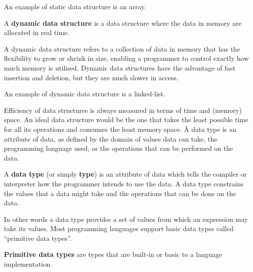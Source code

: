 \be
An example of static data structure is an array.
\ee

A \textbf{dynamic data structure} is a data structure where the data in memory are allocated in real time.
\ed

A dynamic data structure refers to a collection of data in memory that has the flexibility to grow or shrink in size,
enabling a programmer to control exactly how much memory is utilised. Dynamic data structures have the advantage of
fast insertion and deletion, but they are much slower in access.

\be
An example of dynamic data structure is a linked-list.
\ee

Efficiency of data structures is always measured in terms of time and (memory) space. An ideal data structure would
be the one that takes the least possible time for all its operations and consumes the least memory space. \v

A data type is an attribute of data, as defined by the domain of values data can take, the programming language used,
or the operations that can be performed on the data.

A \textbf{data type} (or simply \textbf{type}) is an attribute of data which tells the compiler or interpreter how
the programmer intends to use the data. A data type constrains the values that a data might take and the operations
that can be done on the data.
\ed

In other words a data type provides a set of values from which an expression may take its values. \v

Most programming languages support basic data types called ``primitive data types''.

\textbf{Primitive data types} are types that are built-in or basic to a language implementation.
\ed

